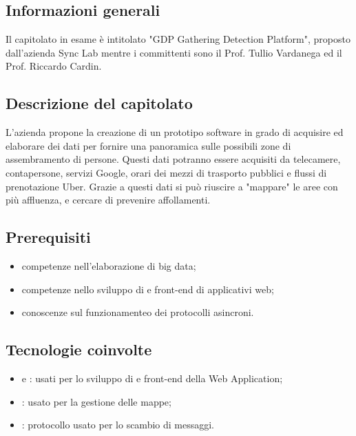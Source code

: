 \subsection{Informazioni generali}
Il capitolato in esame è intitolato "GDP Gathering Detection Platform", proposto dall'azienda Sync Lab mentre i committenti sono il Prof. Tullio Vardanega ed il Prof. Riccardo Cardin.
\subsection{Descrizione del capitolato}
L'azienda propone la creazione di un prototipo software in grado di acquisire ed elaborare dei dati per fornire una panoramica sulle possibili zone di assembramento di persone.
Questi dati potranno essere acquisiti da telecamere, contapersone, servizi Google, orari dei mezzi di trasporto pubblici e flussi di prenotazione Uber.
Grazie a questi dati si può riuscire a "mappare" le aree con più affluenza, e cercare di prevenire affollamenti.
\subsection{Prerequisiti}
\begin{itemize}
    \item competenze nell'elaborazione di big data;
    \item competenze nello sviluppo di  e front-end di applicativi web;
    \item conoscenze sul funzionamenteo dei protocolli asincroni.
\end{itemize}
\subsection{Tecnologie coinvolte}
\begin{itemize}
    \item {} e : usati per lo sviluppo di  e front-end della Web Application;
    \item {}: usato per la gestione delle mappe;
    \item {}: protocollo usato per lo scambio di messaggi.

\end{itemize}
